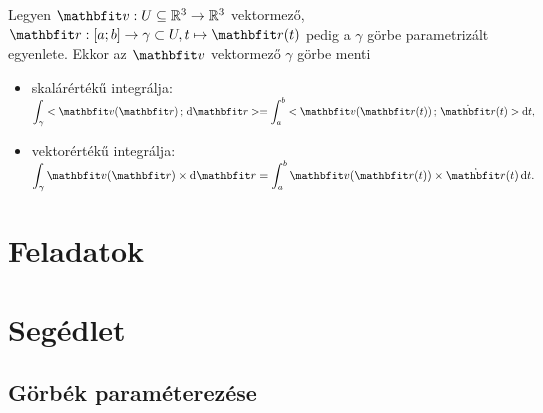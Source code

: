 \documentclass[lang=magyar]{math-handout}
\begin{document}
\vfill

\begin{definition}
  Legyen $\rvec v: U \subseteq \mathbb R^3 \rightarrow \mathbb R^3$ vektormező,
  $\rvec r: [a;b] \rightarrow \gamma \subset U, t \mapsto \rvec r(t)$ pedig a
  $\gamma$ görbe parametrizált egyenlete. Ekkor az $\rvec v$ vektormező $\gamma$
  görbe menti
  \begin{itemize}
    \item skalárértékű integrálja:
          \(
            \displaystyle
            \int_\gamma \scalar{\rvec v(\rvec r)}{\diff \rvec r} =
            \int_a^b \scalar{\rvec v(\rvec r(t))}{\dot{\rvec r}(t)} \diff t
            \text,
          \)
    \item vektorértékű integrálja:
          \(
            \displaystyle
            \int_\gamma \rvec v(\rvec r) \times \diff \rvec r =
            \int_a^b \rvec v(\rvec r(t)) \times \dot{\rvec r}(t) \, \diff t
            \text.
          \)
  \end{itemize}
\end{definition}

\clearpage
\section{Feladatok}


\clearpage
\section{Segédlet}

\subsection{Görbék paraméterezése}
\end{document}
